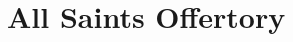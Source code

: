 \documentclass[a5paper]{memoir}
\begin{document}
\thispagestyle{empty}

\section{All Saints Offertory}

\end{document}
